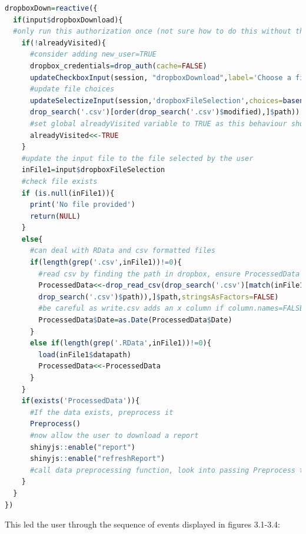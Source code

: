 \begin{lstlisting}[language=R, basicstyle=\tiny]
dropboxDown=reactive({
  if(input$dropboxDownload){
  #only run this authorization once (not sure how to do this without the use of global variable)
    if(!alreadyVisited){
      #consider adding new_user=TRUE
      dropbox_credentials=drop_auth(cache=FALSE)
      updateCheckboxInput(session, "dropboxDownload",label='Choose a file:')
      #update file choices
	  updateSelectizeInput(session,'dropboxFileSelection',choices=basename(
	  drop_search('.csv')[order(drop_search('.csv')$modified),]$path))
	  #set global alreadyVisited variable to TRUE as this behaviour should only occur once
	  alreadyVisited<<-TRUE
	}
	#update the input file to the file selected by the user
	inFile1=input$dropboxFileSelection
	#check file exists
	if (is.null(inFile1)){
	  print('No file provided')
	  return(NULL)
	}
	else{
	  #can deal with RData and csv formatted files
	  if(length(grep('.csv',inFile1))!=0){
	    #read csv by finding the path in dropbox, ensure ProcessedData is global
	    ProcessedData<<-drop_read_csv(drop_search('.csv')[match(inFile1,basename(
	    drop_search('.csv')$path)),]$path,stringsAsFactors=FALSE)
	    #be careful as write.csv adds an x column if column.names=FALSE
	    ProcessedData$Date=as.Date(ProcessedData$Date)
	  }
	  else if(length(grep('.RData',inFile1))!=0){
	    load(inFile1$datapath)
	    ProcessedData<<-ProcessedData
	  }
    }
    if(exists('ProcessedData')){
	  #If the data exists, preprocess it
      Preprocess()
      #now allow the user to download a report
      shinyjs::enable("report")
      shinyjs::enable("refreshReport")
      #call data preprocessing function, look into passing Preprocess to this function
    }
  }
})
\end{lstlisting}
This led the user through the sequence of events displayed in figures 3.1-3.4: 
